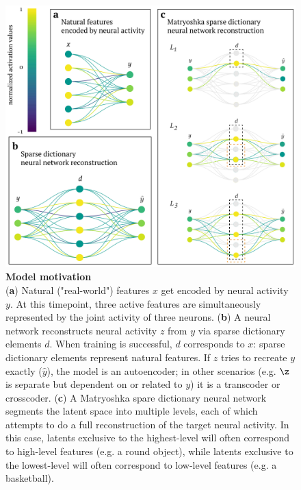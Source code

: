\begin{figure}[h]
    \begin{minipage}{0.64\linewidth}
    \includegraphics[width=\linewidth]{figures/sdnn_arch.pdf}
    \end{minipage}%
    \begin{minipage}{0.35\linewidth}
    \caption{
        \textbf{Model motivation} \\
        \small
        (\textbf{a}) Natural ("real-world") features $x$ get encoded by neural activity $y$. At this timepoint, three active features are simultaneously represented by the joint activity of three neurons. (\textbf{b}) A neural network reconstructs neural activity $z$ from $y$ via sparse dictionary elements $d$. When training is successful, $d$ corresponds to $x$: sparse dictionary elements represent natural features. If $z$ tries to recreate $y$ exactly ($\hat{y}$), the model is an autoencoder; in other scenarios (e.g. $\z$ is separate but dependent on or related to $y$) it is a transcoder or crosscoder. (\textbf{c}) A Matryoshka spare dictionary neural network segments the latent space into multiple levels, each of which attempts to do a full reconstruction of the target neural activity. In this case, latents exclusive to the highest-level will often correspond to high-level features (e.g. a round object), while latents exclusive to the lowest-level will often correspond to low-level features (e.g. a basketball).
    }
    \label{fig:sdnn_arch}
    \end{minipage}
\end{figure}

